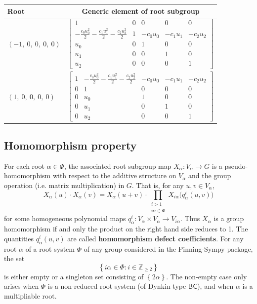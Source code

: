 \documentclass[11pt]{article}
\newcommand{\noi}{\noindent}
\newcommand{\tbf}{\textbf}
\newcommand{\lb}{\left\{}
\newcommand{\rb}{\right\}}
\newcommand{\Z}{\mathbb{Z}}
\theoremstyle{definition}
\begin{document}
\noindent \begin{longtable}{|l|c|}
    \hline
    \textbf{Root} & \textbf{Generic element of root subgroup} \\
    \hline
    \endhead
    $\left( -1, \  0, \  0, \  0, \  0\right)$ & ${\left[\begin{matrix}1 & 0 & 0 & 0 & 0\\- \frac{c_{0} u_{0}^{2}}{2} - \frac{c_{1} u_{1}^{2}}{2} - \frac{c_{2} u_{2}^{2}}{2} & 1 & - c_{0} u_{0} & - c_{1} u_{1} & - c_{2} u_{2}\\u_{0} & 0 & 1 & 0 & 0\\u_{1} & 0 & 0 & 1 & 0\\u_{2} & 0 & 0 & 0 & 1\end{matrix}\right]}$ \\
    \hline
    $\left( 1, \  0, \  0, \  0, \  0\right)$ & ${\left[\begin{matrix}1 & - \frac{c_{0} u_{0}^{2}}{2} - \frac{c_{1} u_{1}^{2}}{2} - \frac{c_{2} u_{2}^{2}}{2} & - c_{0} u_{0} & - c_{1} u_{1} & - c_{2} u_{2}\\0 & 1 & 0 & 0 & 0\\0 & u_{0} & 1 & 0 & 0\\0 & u_{1} & 0 & 1 & 0\\0 & u_{2} & 0 & 0 & 1\end{matrix}\right]}$ \\
    \hline
\end{longtable}


\subsection{Homomorphism property}

\noi For each root $\alpha \in \Phi$, the associated root subgroup map $X_\alpha:V_\alpha \to G$ is a pseudo-homomorphism with respect to the additive structure on $V_\alpha$ and the group operation (i.e. matrix multiplication) in $G$. That is, for any $u,v \in V_\alpha$,
\begin{equation}
\label{pseudo homomorphism}
	X_\alpha(u) \cdot X_\alpha(v) = X_\alpha(u+v) \cdot \prod_{\substack{i > 1 \\ i \alpha \in \Phi}} X_{i \alpha} \Big( q^i_\alpha(u,v) \Big)
\end{equation}
for some homogeneous polynomial maps $q^i_\alpha:V_\alpha \times V_\alpha \to V_{i \alpha}$. Thus $X_\alpha$ is a group homomorphism if and only the product on the right hand side reduces to 1. The quantities $q^i_\alpha(u,v)$ are called \tbf{homomorphism defect coefficients}. For any root $\alpha$ of a root system $\Phi$ of any group considered in the Pinning-Sympy package, the set
\[
	\lb i \alpha \in \Phi : i \in \Z_{\ge 2} \rb
\]
is either empty or a singleton set consisting of $\lb 2 \alpha \rb$. The non-empty case only arises when $\Phi$ is a non-reduced root system (of Dynkin type $\mathsf{BC}$), and when $\alpha$ is a multipliable root. 
\end{document}
